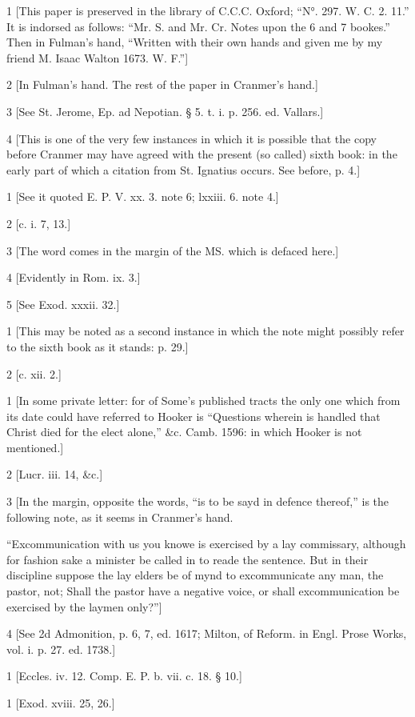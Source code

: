 1
[This paper is preserved in the library of C.C.C. Oxford; “N°. 297. W. C. 2. 11.” It is indorsed as follows: “Mr. S. and Mr. Cr. Notes upon the 6 and 7 bookes.” Then in Fulman’s hand, “Written with their own hands and given me by my friend M. Isaac Walton 1673. W. F.”]

2
[In Fulman’s hand. The rest of the paper in Cranmer’s hand.]

3
[See St. Jerome, Ep. ad Nepotian. § 5. t. i. p. 256. ed. Vallars.]

4
[This is one of the very few instances in which it is possible that the copy before Cranmer may have agreed with the present (so called) sixth book: in the early part of which a citation from St. Ignatius occurs. See before, p. 4.]

1
[See it quoted E. P. V. xx. 3. note 6; lxxiii. 6. note 4.]

2
[c. i. 7, 13.]

3
[The word comes in the margin of the MS. which is defaced here.]

4
[Evidently in Rom. ix. 3.]

5
[See Exod. xxxii. 32.]

1
[This may be noted as a second instance in which the note might possibly refer to the sixth book as it stands: p. 29.]

2
[c. xii. 2.]

1
[In some private letter: for of Some’s published tracts the only one which from its date could have referred to Hooker is “Questions wherein is handled that Christ died for the elect alone,” &c. Camb. 1596: in which Hooker is not mentioned.]

2
[Lucr. iii. 14, &c.]

3
[In the margin, opposite the words, “is to be sayd in defence thereof,” is the following note, as it seems in Cranmer’s hand.

“Excommunication with us you knowe is exercised by a lay commissary, although for fashion sake a minister be called in to reade the sentence. But in their discipline suppose the lay elders be of mynd to excommunicate any man, the pastor, not; Shall the pastor have a negative voice, or shall excommunication be exercised by the laymen only?”]

4
[See 2d Admonition, p. 6, 7, ed. 1617; Milton, of Reform. in Engl. Prose Works, vol. i. p. 27. ed. 1738.]

1
[Eccles. iv. 12. Comp. E. P. b. vii. c. 18. § 10.]

1
[Exod. xviii. 25, 26.]

